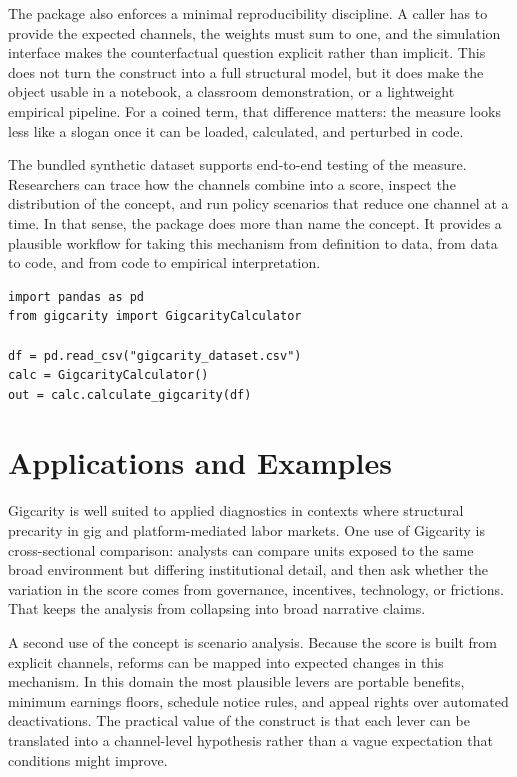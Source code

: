 \documentclass[12pt]{article}
\begin{document}
The package also enforces a minimal reproducibility discipline. A caller has to provide the expected channels, the weights must sum to one, and the simulation interface makes the counterfactual question explicit rather than implicit. This does not turn the construct into a full structural model, but it does make the object usable in a notebook, a classroom demonstration, or a lightweight empirical pipeline. For a coined term, that difference matters: the measure looks less like a slogan once it can be loaded, calculated, and perturbed in code.

The bundled synthetic dataset supports end-to-end testing of the measure. Researchers can trace how the channels combine into a score, inspect the distribution of the concept, and run policy scenarios that reduce one channel at a time. In that sense, the package does more than name the concept. It provides a plausible workflow for taking this mechanism from definition to data, from data to code, and from code to empirical interpretation.

\begin{verbatim}
import pandas as pd
from gigcarity import GigcarityCalculator

df = pd.read_csv("gigcarity_dataset.csv")
calc = GigcarityCalculator()
out = calc.calculate_gigcarity(df)
\end{verbatim}

\section{Applications and Examples}
Gigcarity is well suited to applied diagnostics in contexts where structural precarity in gig and platform-mediated labor markets. One use of Gigcarity is cross-sectional comparison: analysts can compare units exposed to the same broad environment but differing institutional detail, and then ask whether the variation in the score comes from governance, incentives, technology, or frictions. That keeps the analysis from collapsing into broad narrative claims.

A second use of the concept is scenario analysis. Because the score is built from explicit channels, reforms can be mapped into expected changes in this mechanism. In this domain the most plausible levers are portable benefits, minimum earnings floors, schedule notice rules, and appeal rights over automated deactivations. The practical value of the construct is that each lever can be translated into a channel-level hypothesis rather than a vague expectation that conditions might improve.
\end{document}
